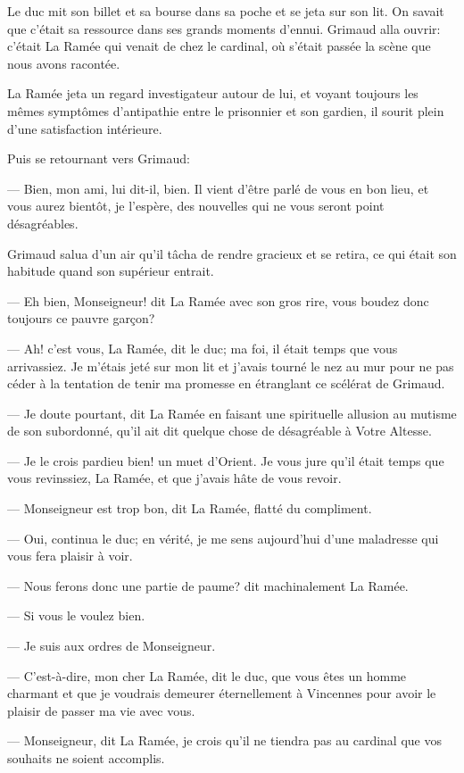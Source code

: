 Le duc mit son billet et sa bourse dans sa poche et se jeta sur son lit. On savait que c'était sa ressource dans ses grands moments d'ennui. Grimaud alla ouvrir: c'était La Ramée qui venait de chez le cardinal, où s'était passée la scène que nous avons racontée.

La Ramée jeta un regard investigateur autour de lui, et voyant toujours les mêmes symptômes d'antipathie entre le prisonnier et son gardien, il sourit plein d'une satisfaction intérieure.

Puis se retournant vers Grimaud:

— Bien, mon ami, lui dit-il, bien. Il vient d'être parlé de vous en bon lieu, et vous aurez bientôt, je l'espère, des nouvelles qui ne vous seront point désagréables.

Grimaud salua d'un air qu'il tâcha de rendre gracieux et se retira, ce qui était son habitude quand son supérieur entrait.

— Eh bien, Monseigneur! dit La Ramée avec son gros rire, vous boudez donc toujours ce pauvre garçon?

— Ah! c'est vous, La Ramée, dit le duc; ma foi, il était temps que vous arrivassiez. Je m'étais jeté sur mon lit et j'avais tourné le nez au mur pour ne pas céder à la tentation de tenir ma promesse en étranglant ce scélérat de Grimaud.

— Je doute pourtant, dit La Ramée en faisant une spirituelle allusion au mutisme de son subordonné, qu'il ait dit quelque chose de désagréable à Votre Altesse.

— Je le crois pardieu bien! un muet d'Orient. Je vous jure qu'il était temps que vous revinssiez, La Ramée, et que j'avais hâte de vous revoir.

— Monseigneur est trop bon, dit La Ramée, flatté du compliment.

— Oui, continua le duc; en vérité, je me sens aujourd'hui d'une maladresse qui vous fera plaisir à voir.

— Nous ferons donc une partie de paume? dit machinalement La Ramée.

— Si vous le voulez bien.

— Je suis aux ordres de Monseigneur.

— C'est-à-dire, mon cher La Ramée, dit le duc, que vous êtes un homme charmant et que je voudrais demeurer éternellement à Vincennes pour avoir le plaisir de passer ma vie avec vous.

— Monseigneur, dit La Ramée, je crois qu'il ne tiendra pas au cardinal que vos souhaits ne soient accomplis.

